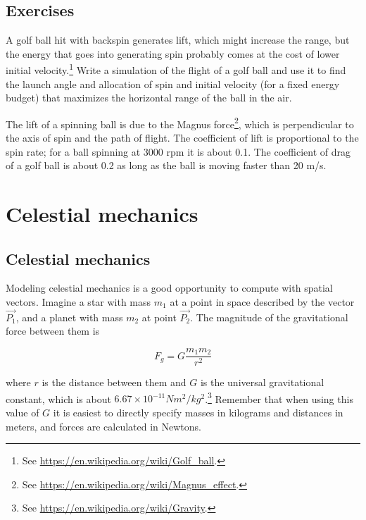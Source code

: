 \documentclass{book}
\begin{document}
\section{Exercises}

\begin{ex}
\label{golf}

A golf ball hit with backspin
generates lift, which might increase the range, but the energy that
goes into generating spin probably comes at the cost of lower initial
velocity.\footnote{See \url{https://en.wikipedia.org/wiki/Golf_ball}.}
Write a simulation of the flight of a golf ball and use it to find
the launch angle and allocation of spin and initial velocity
(for a fixed energy budget) that maximizes the horizontal range of the
ball in the air.

The lift of a spinning ball is due to the Magnus force\footnote{See
\url{https://en.wikipedia.org/wiki/Magnus_effect}.}, which is
perpendicular to the axis of spin and the path of flight.  The
coefficient of lift is proportional to the spin rate; for a ball
spinning at 3000 rpm it is about 0.1.  The coefficient of drag of a
golf ball is about 0.2 as long as the ball is moving faster than 20 m/s.
\end{ex}



\chapter{Celestial mechanics}

\section{Celestial mechanics}

Modeling celestial mechanics is a good opportunity
to compute with spatial vectors.
Imagine a star with mass $m_1$ at a point in space described by the
vector $\vec{P_1}$, and a planet with mass $m_2$ at point $\vec{P_2}$.
The magnitude of the gravitational force between them is

\begin{equation}
F_g = G \frac{m_1 m_2}{r^2}
\end{equation}

where $r$ is the distance between them and $G$ is the universal
gravitational constant, which is about $6.67 \times 10^{-11} N m^2 /
kg^2$.\footnote{See \url{https://en.wikipedia.org/wiki/Gravity}.}
Remember that when using this
value of $G$ it is easiest to directly specify
masses
in kilograms and distances in meters, and forces are calculated in Newtons.
\end{document}
